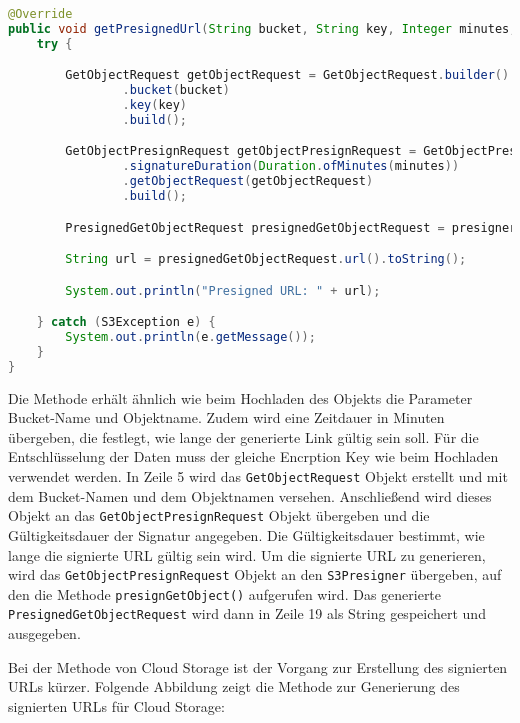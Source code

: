 \begin{lstlisting}[language=Java, caption=Prototyp Code Snippet - Generierung eines signierten URLs durch AWS]
@Override
public void getPresignedUrl(String bucket, String key, Integer minutes, String encryptionKey) {
    try {

        GetObjectRequest getObjectRequest = GetObjectRequest.builder()
                .bucket(bucket)
                .key(key)
                .build();

        GetObjectPresignRequest getObjectPresignRequest = GetObjectPresignRequest.builder()
                .signatureDuration(Duration.ofMinutes(minutes))
                .getObjectRequest(getObjectRequest)
                .build();

        PresignedGetObjectRequest presignedGetObjectRequest = presigner.presignGetObject(getObjectPresignRequest);

        String url = presignedGetObjectRequest.url().toString();

        System.out.println("Presigned URL: " + url);

    } catch (S3Exception e) {
        System.out.println(e.getMessage());
    }
}
\end{lstlisting}

Die Methode erhält ähnlich wie beim Hochladen des Objekts die Parameter Bucket-Name und Objektname. Zudem wird eine Zeitdauer in Minuten übergeben, die festlegt, wie lange der generierte Link gültig sein soll. Für die Entschlüsselung der Daten muss der gleiche Encrption Key wie beim Hochladen verwendet werden. In Zeile 5 wird das \verb|GetObjectRequest| Objekt erstellt und mit dem Bucket-Namen und dem Objektnamen versehen. Anschließend wird dieses Objekt an das \verb|GetObjectPresignRequest| Objekt übergeben und die Gültigkeitsdauer der Signatur angegeben. Die Gültigkeitsdauer bestimmt, wie lange die signierte URL gültig sein wird. Um die signierte URL zu generieren, wird das \verb|GetObjectPresignRequest| Objekt an den \verb|S3Presigner| übergeben, auf den die Methode \verb|presignGetObject()| aufgerufen wird. Das generierte \verb|PresignedGetObjectRequest| wird dann in Zeile 19 als String gespeichert und ausgegeben.

\newpage

Bei der Methode von Cloud Storage ist der Vorgang zur Erstellung des signierten URLs kürzer. Folgende Abbildung zeigt die Methode zur Generierung des signierten URLs für Cloud Storage:

